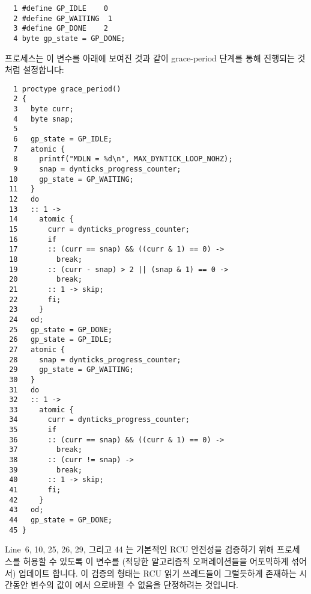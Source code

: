 \vspace{5pt}
\begin{minipage}[t]{\columnwidth}
\begin{verbatim}
  1 #define GP_IDLE    0
  2 #define GP_WAITING  1
  3 #define GP_DONE    2
  4 byte gp_state = GP_DONE;
\end{verbatim}
\end{minipage}
\vspace{5pt}

 프로세스는 이 변수를 아래에 보여진 것과 같이 grace-period
단계를 통해 진행되는 것처럼 설정합니다:
\iffalse

The \co{grace_period()} process sets this variable as it
progresses through the grace-period phases, as shown below:
\fi

{ \scriptsize
\begin{verbatim}
  1 proctype grace_period()
  2 {
  3   byte curr;
  4   byte snap;
  5
  6   gp_state = GP_IDLE;
  7   atomic {
  8     printf("MDLN = %d\n", MAX_DYNTICK_LOOP_NOHZ);
  9     snap = dynticks_progress_counter;
 10     gp_state = GP_WAITING;
 11   }
 12   do
 13   :: 1 ->
 14     atomic {
 15       curr = dynticks_progress_counter;
 16       if
 17       :: (curr == snap) && ((curr & 1) == 0) ->
 18         break;
 19       :: (curr - snap) > 2 || (snap & 1) == 0 ->
 20         break;
 21       :: 1 -> skip;
 22       fi;
 23     }
 24   od;
 25   gp_state = GP_DONE;
 26   gp_state = GP_IDLE;
 27   atomic {
 28     snap = dynticks_progress_counter;
 29     gp_state = GP_WAITING;
 30   }
 31   do
 32   :: 1 ->
 33     atomic {
 34       curr = dynticks_progress_counter;
 35       if
 36       :: (curr == snap) && ((curr & 1) == 0) ->
 37         break;
 38       :: (curr != snap) ->
 39         break;
 40       :: 1 -> skip;
 41       fi;
 42     }
 43   od;
 44   gp_state = GP_DONE;
 45 }
\end{verbatim}
}

Line~6, 10, 25, 26, 29, 그리고 44 는 기본적인 RCU 안전성을 검증하기 위해
 프로세스를 허용할 수 있도록 이 변수를 (적당한 알고리즘적
오퍼레이션들을 어토믹하게 섞어서) 업데이트 합니다.
이 검증의 형태는 RCU 읽기 쓰레드들이 그럴듯하게 존재하는 시간동안 
변수의 값이  에서  으로바뀔 수 없음을 단정하려는
것입니다.
\iffalse

Lines~6, 10, 25, 26, 29, and~44 update this variable (combining
atomically with algorithmic operations where feasible) to
allow the \co{dyntick_nohz()} process to verify the basic
RCU safety property.
The form of this verification is to assert that the value of the
\co{gp_state} variable cannot jump from
\co{GP_IDLE} to \co{GP_DONE} during a time period
over which RCU readers could plausibly persist.
\fi

